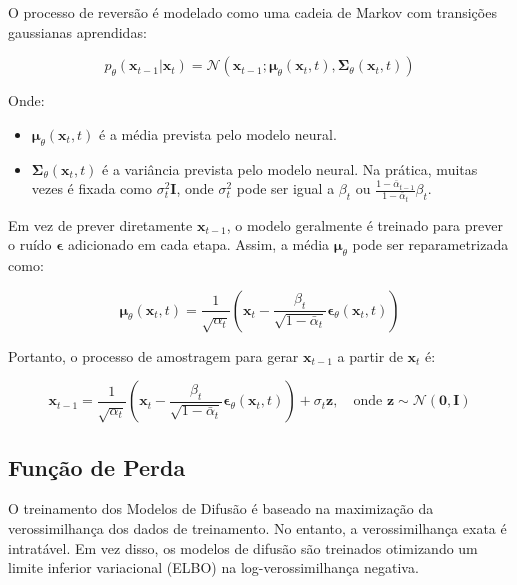 \documentclass{tufte-handout}
\begin{document}
O processo de reversão é modelado como uma cadeia de Markov com transições gaussianas aprendidas:

\begin{equation}
    p_\theta(\mathbf{x}_{t-1} | \mathbf{x}_t) = \mathcal{N}(\mathbf{x}_{t-1}; \boldsymbol{\mu}_\theta(\mathbf{x}_t, t), \boldsymbol{\Sigma}_\theta(\mathbf{x}_t, t))
\end{equation}

Onde:
\begin{itemize}
    \item $\boldsymbol{\mu}_\theta(\mathbf{x}_t, t)$ é a média prevista pelo modelo neural.
    \item $\boldsymbol{\Sigma}_\theta(\mathbf{x}_t, t)$ é a variância prevista pelo modelo neural. Na prática, muitas vezes é fixada como $\sigma_t^2 \mathbf{I}$, onde $\sigma_t^2$ pode ser igual a $\beta_t$ ou $\frac{1 - \bar{\alpha}_{t-1}}{1 - \bar{\alpha}_t} \beta_t$.
\end{itemize}

Em vez de prever diretamente $\mathbf{x}_{t-1}$, o modelo geralmente é treinado para prever o ruído $\boldsymbol{\epsilon}$ adicionado em cada etapa. Assim, a média $\boldsymbol{\mu}_\theta$ pode ser reparametrizada como:

\begin{equation}
    \boldsymbol{\mu}_\theta(\mathbf{x}_t, t) = \frac{1}{\sqrt{\alpha_t}} \left( \mathbf{x}_t - \frac{\beta_t}{\sqrt{1 - \bar{\alpha}_t}} \boldsymbol{\epsilon}_\theta(\mathbf{x}_t, t) \right)
\end{equation}

Portanto, o processo de amostragem para gerar $\mathbf{x}_{t-1}$ a partir de $\mathbf{x}_t$ é:

\begin{equation}
    \mathbf{x}_{t-1} = \frac{1}{\sqrt{\alpha_t}} \left( \mathbf{x}_t - \frac{\beta_t}{\sqrt{1 - \bar{\alpha}_t}} \boldsymbol{\epsilon}_\theta(\mathbf{x}_t, t) \right) + \sigma_t \mathbf{z}, \quad \text{onde } \mathbf{z} \sim \mathcal{N}(\mathbf{0}, \mathbf{I})
\end{equation}

\subsection{Função de Perda}

O treinamento dos Modelos de Difusão é baseado na maximização da verossimilhança dos dados de treinamento. No entanto, a verossimilhança exata é intratável. Em vez disso, os modelos de difusão são treinados otimizando um limite inferior variacional (ELBO) na log-verossimilhança negativa.
\end{document}
